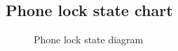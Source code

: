 \documentclass[11pt,a4paper]{article}
\begin{document}
\newpage

\subsection{Phone lock state chart}
\begin{figure}[htb]
    \begin{center}
        \setlength\fboxsep{0pt}
        \caption{Phone lock state diagram}
        \label{fig:class_diag}
    \end{center}
\end{figure}
\end{document}
